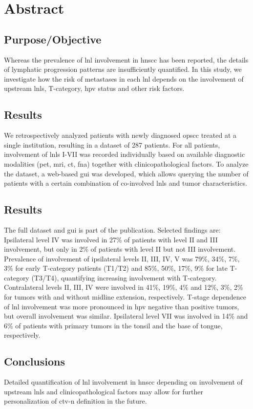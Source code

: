 \documentclass[\relativeRoot/main.tex]{subfiles}
\begin{document}
\section{Abstract}
\label{sec:dataset_usz:asbtract}

\subsection*{Purpose/Objective}

Whereas the prevalence of \gls{lnl} involvement in \gls{hnscc} has been reported, the details of lymphatic progression patterns are insufficiently quantified. In this study, we investigate how the risk of metastases in each \gls{lnl} depends on the involvement of upstream \glspl{lnl}, T-category, \gls{hpv} status and other risk factors.

\subsection*{Results}

We retrospectively analyzed patients with newly diagnosed \gls{opscc} treated at a single institution, resulting in a dataset of 287 patients. For all patients, involvement of \glspl{lnl} I-VII was recorded individually based on available diagnostic modalities (\gls{pet}, \gls{mri}, \gls{ct}, \gls{fna}) together with clinicopathological factors. To analyze the dataset, a web-based \gls{gui} was developed, which allows querying the number of patients with a certain combination of co-involved \glspl{lnl} and tumor characteristics.

\subsection*{Results}

The full dataset and \gls{gui} is part of the publication. Selected findings are: Ipsilateral level IV was involved in 27\% of patients with level II and III involvement, but only in 2\% of patients with level II but not III involvement. Prevalence of involvement of ipsilateral levels II, III, IV, V was 79\%, 34\%, 7\%, 3\% for early T-category patients (T1/T2) and 85\%, 50\%, 17\%, 9\% for late T-category (T3/T4), quantifying increasing involvement with T-category. Contralateral levels II, III, IV were involved in 41\%, 19\%, 4\% and 12\%, 3\%, 2\% for tumors with and without midline extension, respectively. T-stage dependence of \gls{lnl} involvement was more pronounced in \gls{hpv} negative than positive tumors, but overall involvement was similar. Ipsilateral level VII was involved in 14\% and 6\% of patients with primary tumors in the tonsil and the base of tongue, respectively.

\subsection*{Conclusions}

Detailed quantification of \gls{lnl} involvement in \gls{hnscc} depending on involvement of upstream \glspl{lnl} and clinicopathological factors may allow for further personalization of \gls{ctv-n} definition in the future.
\end{document}
